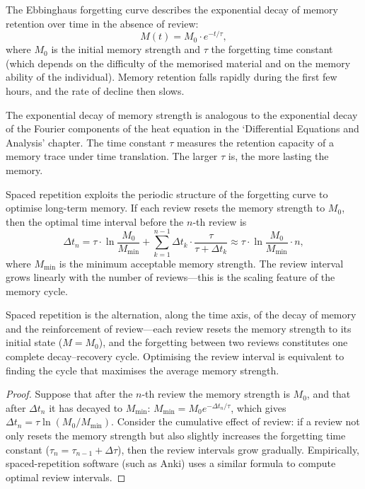 \begin{definition}\label{def:ebbinghaus}
The Ebbinghaus forgetting curve describes the exponential decay of memory retention over time in the absence of review:
\[
M(t) = M_0 \cdot e^{-t/\tau},
\]
where $M_0$ is the initial memory strength and $\tau$ the forgetting time constant (which depends on the difficulty of the memorised material and on the memory ability of the individual). Memory retention falls rapidly during the first few hours, and the rate of decline then slows.

The exponential decay of memory strength is analogous to the exponential decay of the Fourier components of the heat equation in the `Differential Equations and Analysis' chapter. The time constant $\tau$ measures the retention capacity of a memory trace under time translation. The larger $\tau$ is, the more lasting the memory.
\end{definition}

\begin{proposition}\label{prop:spaced_repetition}
Spaced repetition exploits the periodic structure of the forgetting curve to optimise long-term memory. If each review resets the memory strength to $M_0$, then the optimal time interval before the $n$-th review is
\[
\Delta t_n = \tau \cdot \ln\frac{M_0}{M_{\min}} + \sum_{k=1}^{n-1} \Delta t_k \cdot \frac{\tau}{\tau + \Delta t_k} \approx \tau \cdot \ln\frac{M_0}{M_{\min}} \cdot n,
\]
where $M_{\min}$ is the minimum acceptable memory strength. The review interval grows linearly with the number of reviews---this is the scaling feature of the memory cycle.

Spaced repetition is the alternation, along the time axis, of the decay of memory and the reinforcement of review---each review resets the memory strength to its initial state ($M = M_0$), and the forgetting between two reviews constitutes one complete decay--recovery cycle. Optimising the review interval is equivalent to finding the cycle that maximises the average memory strength.
\end{proposition}

\begin{proof}
Suppose that after the $n$-th review the memory strength is $M_0$, and that after $\Delta t_n$ it has decayed to $M_{\min}$: $M_{\min} = M_0 e^{-\Delta t_n/\tau}$, which gives $\Delta t_n = \tau \ln(M_0/M_{\min})$. Consider the cumulative effect of review: if a review not only resets the memory strength but also slightly increases the forgetting time constant ($\tau_n = \tau_{n-1} + \Delta\tau$), then the review intervals grow gradually. Empirically, spaced-repetition software (such as Anki) uses a similar formula to compute optimal review intervals.
\end{proof}

